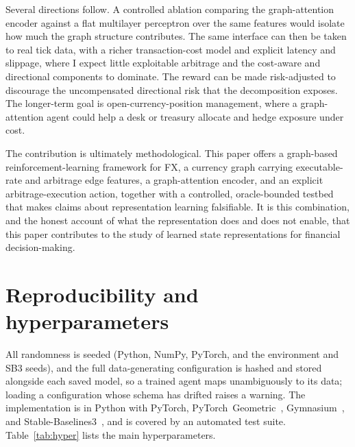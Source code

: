 \documentclass[12pt,a4paper]{article}
\begin{document}
Several directions follow. A controlled ablation comparing the graph-attention encoder against a
flat multilayer perceptron over the same features would isolate how much the graph structure
contributes. The same interface can then be taken to real tick data, with a richer
transaction-cost model and explicit latency and slippage, where I expect little exploitable
arbitrage and the cost-aware and directional components to dominate. The reward can be made
risk-adjusted to discourage the uncompensated directional risk that the decomposition exposes.
The longer-term goal is open-currency-position management, where a graph-attention agent could
help a desk or treasury allocate and hedge exposure under cost.

The contribution is ultimately methodological. This paper offers a graph-based
reinforcement-learning framework for FX, a currency graph carrying executable-rate and arbitrage
edge features, a graph-attention encoder, and an explicit arbitrage-execution action, together
with a controlled, oracle-bounded testbed that makes claims about representation learning
falsifiable. It is this combination, and the honest account of what the representation does and
does not enable, that this paper contributes to the study of learned state representations for
financial decision-making.

\clearpage




\clearpage

\appendix
\section{Reproducibility and hyperparameters}
\label{app:repro}
All randomness is seeded (Python, NumPy, PyTorch, and the environment and SB3 seeds), and the
full data-generating configuration is hashed and stored alongside each saved model, so a trained
agent maps unambiguously to its data; loading a configuration whose schema has drifted raises a
warning. The implementation is in Python with PyTorch, PyTorch~Geometric~\citep{fey2019pyg},
Gymnasium~\citep{towers2023gymnasium}, and Stable-Baselines3~\citep{raffin2021sb3}, and is
covered by an automated test suite. Table~\ref{tab:hyper} lists the main hyperparameters.
\end{document}

